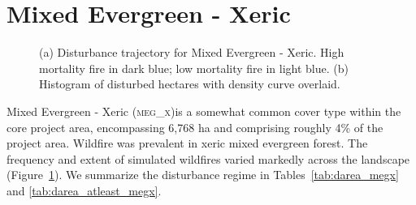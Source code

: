 
\clearpage
\section{Mixed Evergreen - Xeric} 
\begin{figure}[!htbp]
  \centering
  \caption{\small (a) Disturbance trajectory for Mixed Evergreen - Xeric. High mortality fire in dark blue; low mortality fire in light blue. (b) Histogram of disturbed hectares with density curve overlaid.} 
  \label{fig:darea_megx}
\end{figure}


Mixed Evergreen - Xeric (\textsc{meg\_x})is a somewhat common cover type within the core project area, encompassing 6,768 ha and comprising roughly 4\% of the project area. Wildfire was prevalent in xeric mixed evergreen forest. The frequency and extent of simulated wildfires varied markedly across the landscape (Figure~\ref{fig:darea_megx}). We summarize the disturbance regime in Tables~\ref{tab:darea_megx} and \ref{tab:darea_atleast_megx}.


